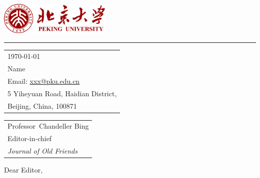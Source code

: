 \documentclass{article}
\newlength{\rulewidth}
\begin{document}

\includegraphics[width=0.4\textwidth]{./img/pku.drawio.pdf} %

\vspace{-1em} %

\textcolor{pkured}{\rule{\linewidth}{}} %

\bigskip\bigskip %


\hfill
\begin{tabular}{l @{}}
\hfill \today \bigskip\\ %
\hfill Name \\ %
\hfill Email: \url{xxx@pku.edu.cn} \\ %
\hfill 5 Yiheyuan Road, Haidian District,\\
\hfill Beijing, China, 100871 \\ %
\end{tabular}

\bigskip %


\begin{tabular}{@{} l}
	Professor\ Chandeller Bing \\
	Editor-in-chief \\
	\textit{Journal of Old Friends}
\end{tabular}

\bigskip %

Dear Editor,

\bigskip %

\end{document}
